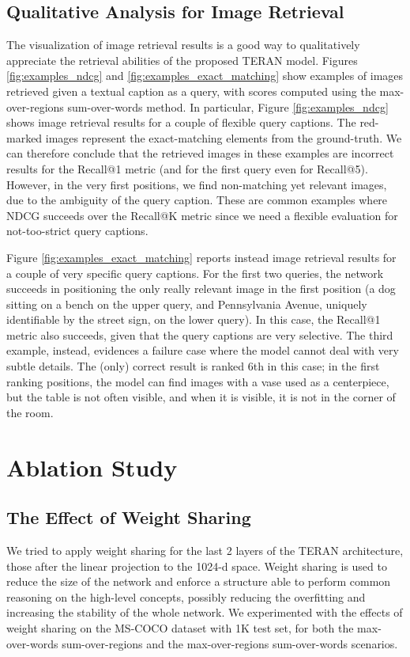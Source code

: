 \documentclass[acmsmall]{acmart}
\newif\ifdraft
\newcommand{\revised}[1]{\ifdraft{\leavevmode\color{blue}{#1}}\else{#1}\fi}
\begin{document}
\subsection{Qualitative Analysis for Image Retrieval}
The visualization of image retrieval results is a good way to qualitatively appreciate the retrieval abilities of the proposed TERAN model.
Figures \ref{fig:examples_ndcg} and \ref{fig:examples_exact_matching} show examples of images retrieved given a textual caption as a query, with scores computed using the max-over-regions sum-over-words method. 
In particular, Figure \ref{fig:examples_ndcg} shows image retrieval results for a couple of flexible query captions. The red-marked images represent the exact-matching elements from the ground-truth. We can therefore conclude that the retrieved images in these examples are incorrect results for the Recall@1 metric (and for the first query even for Recall@5). However, in the very first positions, we find non-matching yet relevant images, due to the ambiguity of the query caption. These are common examples where NDCG succeeds over the Recall@K metric since we need a flexible evaluation for not-too-strict query captions.

Figure \ref{fig:examples_exact_matching} reports instead image retrieval results for a couple of very specific query captions. For the first two queries, the network succeeds in positioning the only really relevant image in the first position (a dog sitting on a bench on the upper query, and Pennsylvania Avenue, uniquely identifiable by the street sign, on the lower query). In this case, the Recall@1 metric also succeeds, given that the query captions are very selective. \revised{The third example, instead, evidences a failure case where the model cannot deal with very subtle details. The (only) correct result is ranked 6th in this case; in the first ranking positions, the model can find images with a vase used as a centerpiece, but the table is not often visible, and when it is visible, it is not in the corner of the room.}

\section{Ablation Study}
\subsection{The Effect of Weight Sharing}
\label{sec:weight_sharing}
We tried to apply weight sharing for the last 2 layers of the TERAN architecture, those after the linear projection to the 1024-d space. Weight sharing is used to reduce the size of the network and enforce a structure able to perform common reasoning on the high-level concepts, possibly reducing the overfitting and increasing the stability of the whole network.
We experimented with the effects of weight sharing on the MS-COCO dataset with 1K test set, for both the max-over-words sum-over-regions and the max-over-regions sum-over-words scenarios. 
\end{document}

